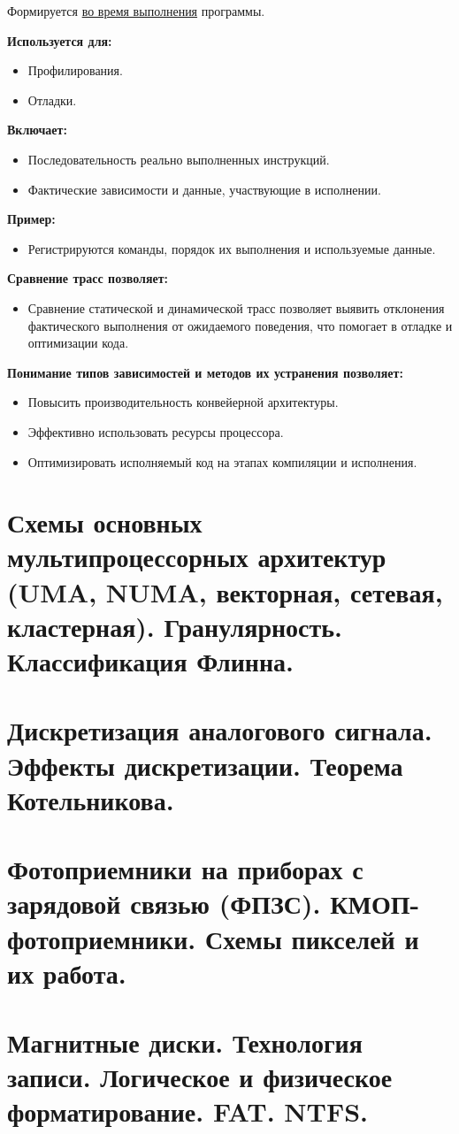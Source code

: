 	Формируется \uline{во время выполнения} программы.
	
	\textbf{Используется для:}
	
	\begin{itemize}
		\item Профилирования.
		\item Отладки.
	\end{itemize}
	
	\textbf{Включает:}
	\begin{itemize}
		\item Последовательность реально выполненных инструкций.
		\item Фактические зависимости и данные, участвующие в исполнении.
	\end{itemize}
	
	\textbf{Пример:}
	\begin{itemize}
		\item Регистрируются команды, порядок их выполнения и используемые данные.
	\end{itemize}
	
	\textbf{Сравнение трасс позволяет:}
	\begin{itemize}
		\item Сравнение статической и динамической трасс позволяет выявить отклонения фактического выполнения от ожидаемого поведения, что помогает в отладке и оптимизации кода.
	\end{itemize}
	
	\textbf{Понимание типов зависимостей и методов их устранения позволяет:}
	\begin{itemize}
		\item Повысить производительность конвейерной архитектуры.
		\item Эффективно использовать ресурсы процессора.
		\item Оптимизировать исполняемый код на этапах компиляции и исполнения.
	\end{itemize}
	
	\newpage
	
	\section{Схемы основных мультипроцессорных архитектур (UMA, NUMA, векторная, сетевая, кластерная). Гранулярность. Классификация Флинна.}
	
	\section{Дискретизация аналогового сигнала. Эффекты дискретизации. Теорема Котельникова.}
	
	\section{Фотоприемники на приборах с зарядовой связью (ФПЗС). КМОП-фотоприемники. Схемы пикселей и их работа.}
	
	\section{Магнитные диски.  Технология записи.  Логическое и физическое форматирование. FAT. NTFS.}
	
